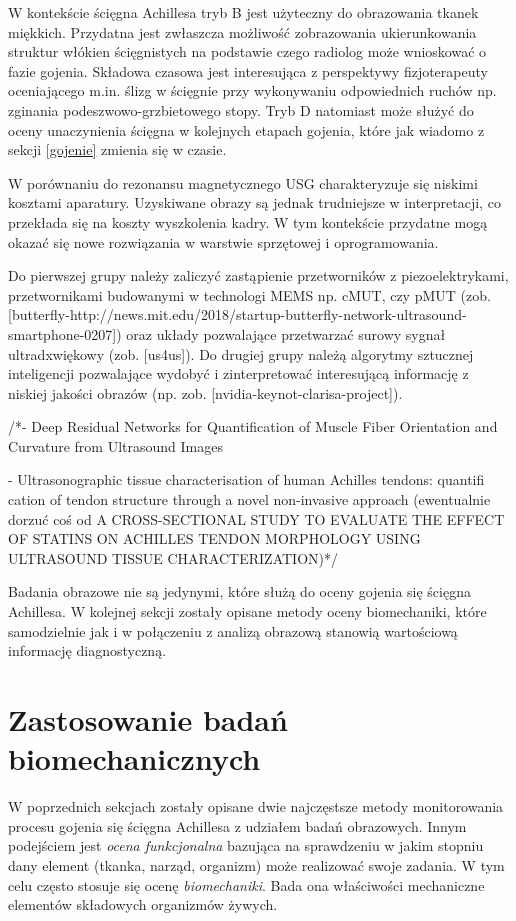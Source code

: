 W kontekście ścięgna Achillesa tryb B jest użyteczny do obrazowania tkanek miękkich. Przydatna jest zwłaszcza możliwość zobrazowania ukierunkowania struktur włókien ścięgnistych na podstawie czego radiolog może wnioskować o fazie gojenia. Składowa czasowa jest interesująca z perspektywy fizjoterapeuty oceniającego m.in. ślizg w ścięgnie przy wykonywaniu odpowiednich ruchów np. zginania podeszwowo-grzbietowego stopy. Tryb D natomiast może służyć do oceny unaczynienia ścięgna w kolejnych etapach gojenia, które jak wiadomo z sekcji \ref{gojenie} zmienia się w czasie.

W porównaniu do rezonansu magnetycznego USG charakteryzuje się niskimi kosztami aparatury. Uzyskiwane obrazy są jednak trudniejsze w interpretacji, co przekłada się na koszty wyszkolenia kadry. W tym kontekście przydatne mogą okazać się nowe rozwiązania w warstwie sprzętowej i oprogramowania. 

Do pierwszej grupy należy zaliczyć zastąpienie przetworników z piezoelektrykami, przetwornikami budowanymi w technologi MEMS np. cMUT, czy pMUT (zob. [butterfly-http://news.mit.edu/2018/startup-butterfly-network-ultrasound-smartphone-0207]) oraz układy pozwalające przetwarzać surowy sygnał ultradxwiękowy (zob. [us4us]). Do drugiej grupy należą algorytmy sztucznej inteligencji pozwalające wydobyć i zinterpretować interesującą informację z niskiej jakości obrazów (np. zob. [nvidia-keynot-clarisa-project]). 

/*- Deep Residual Networks for Quantification
of Muscle Fiber Orientation and Curvature
from Ultrasound Images

- Ultrasonographic tissue characterisation of human
Achilles tendons: quantifi cation of tendon structure
through a novel non-invasive approach (ewentualnie dorzuć coś od A CROSS-SECTIONAL STUDY TO EVALUATE THE EFFECT OF STATINS ON ACHILLES TENDON MORPHOLOGY USING ULTRASOUND TISSUE CHARACTERIZATION)*/

Badania obrazowe nie są jedynymi, które służą do oceny gojenia się ścięgna Achillesa. W kolejnej sekcji zostały opisane metody oceny biomechaniki, które samodzielnie jak i w połączeniu z analizą obrazową stanowią wartościową informację diagnostyczną.

\section{Zastosowanie badań biomechanicznych}

W poprzednich sekcjach zostały opisane dwie najczęstsze metody monitorowania procesu gojenia się ścięgna Achillesa z udziałem badań obrazowych. Innym podejściem jest \textit{ocena funkcjonalna} bazująca na sprawdzeniu w jakim stopniu dany element (tkanka, narząd, organizm) może realizować swoje zadania. W tym celu często stosuje się ocenę \textit{biomechaniki}. Bada ona właściwości mechaniczne elementów składowych organizmów żywych. 

